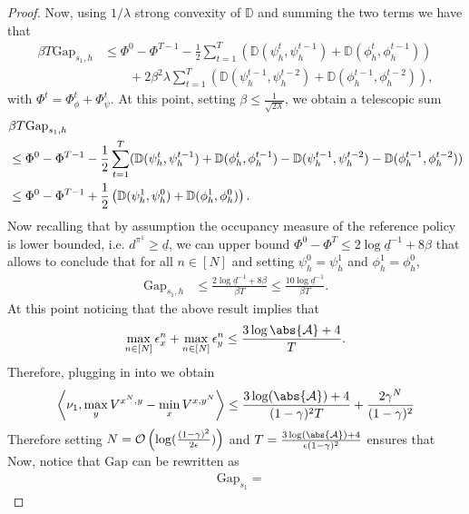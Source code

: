 \begin{proof}
Now, using $1/\lambda$ strong convexity of $\mathbb{D}$ and summing the two terms we have that
\begin{align*}
    \beta T \mathrm{Gap}_{s_1,h} &\leq \Phi^0 - \Phi^{T-1} - \frac{1}{2}\sum^T_{t=1} (\mathbb{D}(\psi_h^t, \psi_h^{t-1}) + \mathbb{D}(\phi_h^t, \phi_h^{t-1})) \\& \qquad + 2  \beta^2 \lambda\sum^T_{t=1} (\mathbb{D}(\psi_h^{t-1}, \psi_h^{t-2}) + \mathbb{D}(\phi_h^{t-1}, \phi_h^{t-2})),
\end{align*}
with $\Phi^t = \Phi^t_\phi + \Phi^t_\psi$. At this point, setting $ \beta \leq \frac{1}{\sqrt{2\lambda} }$, we obtain a telescopic sum
\begin{align*}
   & \beta T \mathrm{Gap}_{s_1, h} \\ &\leq \Phi^0 - \Phi^{T-1} - \frac{1}{2}\sum^T_{t=1} (\mathbb{D}(\psi_h^t, \psi_h^{t-1}) + \mathbb{D}(\phi_h^t, \phi_h^{t-1}) - \mathbb{D}(\psi_h^{t-1}, \psi_h^{t-2}) - \mathbb{D}(\phi_h^{t-1}, \phi_h^{t-2})) \\
    &\leq \Phi^0 - \Phi^{T-1} + \frac{1}{2}\left({\mathbb{D}(\psi_h^1, \psi_h^0) + \mathbb{D}(\phi_h^1,\phi_h^0)}\right).
\end{align*}
Now recalling that by assumption the occupancy measure of the reference policy is lower bounded, i.e. $d^{\pi^1} \geq \underline{d}$, we can upper bound $\Phi^0 - \Phi^T \leq 2 \log \underline{d}^{-1} + 8  \beta$ that allows to conclude that for all $n \in [N]$ and setting $\psi_h^0 = \psi_h^1$ and $\phi^1_h = \phi^0_h$, 
\begin{align*}
    \mathrm{Gap}_{s_1,h} &\leq \frac{2 \log \underline{d}^{-1} + 8 \beta}{\beta T} \leq \frac{10\log \underline{d}^{-1} }{\beta T}.
\end{align*}
At this point noticing that the above result implies that $$\max_{n \in [N]} \epsilon^n_x + \max_{n\in[N]} \epsilon^n_y \leq \frac{3 \log \abs{\mathcal{A}} + 4}{T}.$$
Therefore, plugging in into \cite[Theorem 1]{perolat2015approximate} we obtain
\begin{equation*}
    \innerprod{\initial}{\max_{y} V^{x^N,y} - \min_x V^{x,y^N}} \leq \frac{3 \log(\abs{\mathcal{A}})+4}{(1 - \gamma)^2 T}  + \frac{2 \gamma^N}{(1 - \gamma)^2}
\end{equation*}
Therefore setting $N = \mathcal{O}\left({\log (\frac{(1 - \gamma)^2}{2 \epsilon})}\right)$ and $T = \frac{3 \log(\abs{\mathcal{A}})+4}{\epsilon (1 - \gamma)^2}$ ensures that
\fi
Now, notice that $\mathrm{Gap}$ can be rewritten as 
\begin{align*}
& \mathrm{Gap}_{s_1} = 

\end{align*}
\end{proof}
